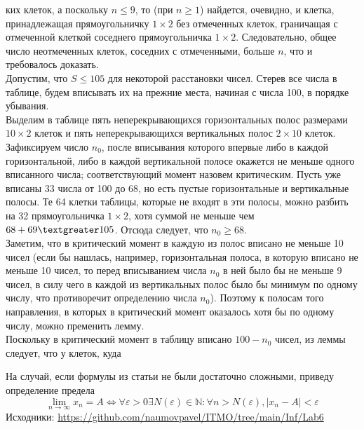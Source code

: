 \begin{multicols}{2}
ких клеток, а поскольку $n \leq 9$, то (при $n \geq 1$) найдется, очевидно, и клетка, принадлежащая прямоугольничку $1\times2$ без отмеченных клеток, граничащая с отмеченной клеткой соседнего прямоугольничка $1\times2$. Следовательно, общее число неотмеченных клеток, соседних с отмеченными, больше $n$, что и требовалось доказать.\\Допустим, что $S \leq 105$ для некоторой расстановки чисел. Стерев все числа в таблице, будем вписывать их на прежние места, начиная с числа 100, в порядке убывания.\\Выделим в таблице пять неперекрывающихся горизонтальных полос размерами $10\times2$ клеток и пять неперекрывающихся вертикальных полос $2\times10$ клеток. Зафиксируем число $n_0$, после вписывания которого впервые либо в каждой горизонтальной, либо в каждой вертикальной полосе окажется не меньше одного вписанного числа; соответствующий момент назовем критическим. Пусть уже вписаны 33 числа от 100 до 68, но есть пустые горизонтальные и вертикальные полосы. Те 64 клетки таблицы, которые не входят в эти полосы, можно разбить на 32 прямоугольничка $1\times2$, хотя суммой не меньше чем $68 + 69 \textgreater 105$. Отсюда следует, что $n_0 \geq 68$.\\Заметим, что в критический момент в каждую из полос вписано не меньше 10 чисел (если бы нашлась, например, горизонтальная полоса, в которую вписано не меньше 10 чисел, то перед вписыванием числа $n_0$ в ней было бы не меньше 9 чисел, в силу чего в каждой из вертикальных полос было бы минимум по одному числу, что противоречит определению числа $n_0$). Поэтому к полосам того направления, в которых в критический момент оказалось хотя бы по одному числу, можно пременить лемму.\\Поскольку в критический момент в таблицу вписано $100 - n_0$ чисел, из леммы следует, что у клеток, куда
\end{multicols}
\newpage
На случай, если формулы из статьи не были достаточно сложными, приведу определение предела
\[\lim_{n\to\infty}x_n = A \Leftrightarrow \forall \varepsilon > 0  \exists N(\varepsilon) \in \mathbb{N} : \forall n > N(\varepsilon),  \lvert x_n - A\rvert < \varepsilon\]
Исходники: 
\url{https://github.com/naumovpavel/ITMO/tree/main/Inf/Lab6} 
